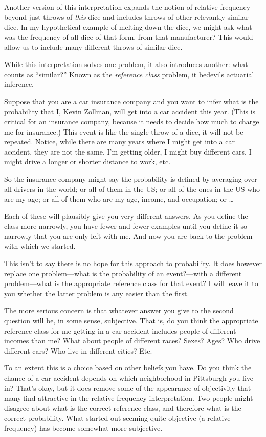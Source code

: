 Another version of this interpretation expands the notion of relative frequency beyond just throws of {\it this} dice and includes throws of other relevantly similar dice.  In my hypothetical example of melting down the dice, we might ask what was the frequency of all dice of that form, from that manufacturer?  This would allow us to include many different throws of similar dice.

While this interpretation solves one problem, it also introduces another: what counts as ``similar?''  Known as the {\it reference class} problem, it bedevils actuarial inference.

Suppose that you are a car insurance company and you want to infer what is the probability that I, Kevin Zollman, will get into a car accident this year.  (This is critical for an insurance company, because it needs to decide how much to charge me for insurance.) This event is like the single throw of a dice, it will not be repeated.  Notice, while there are many years where I might get into a car accident, they are not the same. I'm getting older, I might buy different cars, I might drive a longer or shorter distance to work, etc.  

So the insurance company might say the probability is defined by averaging over all drivers in the world; or all of them in the US; or all of the ones in the US who are my age; or all of them who are my age, income, and occupation; or \dots

Each of these will plausibly give you very different answers.  As you define the class more narrowly, you have fewer and fewer examples until you define it so narrowly that you are only left with me. And now you are back to the problem with which we started.

This isn't to say there is no hope for this approach to probability. It does however replace one problem---what is the probability of an event?---with a different problem---what is the appropriate reference class for that event?  I will leave it to you whether the latter problem is any easier than the first.

The more serious concern is that whatever answer you give to the second question will be, in some sense, subjective.  That is, do you think the appropriate reference class for me getting in a car accident includes people of different incomes than me? What about people of different races? Sexes? Ages? Who drive different cars? Who live in different cities? Etc.

To an extent this is a choice based on other beliefs you have. Do you think the chance of a car accident depends on which neighborhood in Pittsburgh you live in?  That's okay, but it does remove some of the appearance of objectivity that many find attractive in the relative frequency interpretation.  Two people might disagree about what is the correct reference class, and therefore what is the correct probability.  What started out seeming quite objective (a relative frequency) has become somewhat more subjective.

